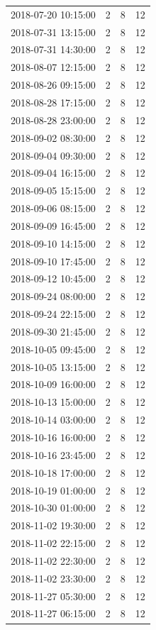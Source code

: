 \begin{tabular}{lrrr}
2018-07-20 10:15:00 & 2 & 8 & 12 \\
2018-07-31 13:15:00 & 2 & 8 & 12 \\
2018-07-31 14:30:00 & 2 & 8 & 12 \\
2018-08-07 12:15:00 & 2 & 8 & 12 \\
2018-08-26 09:15:00 & 2 & 8 & 12 \\
2018-08-28 17:15:00 & 2 & 8 & 12 \\
2018-08-28 23:00:00 & 2 & 8 & 12 \\
2018-09-02 08:30:00 & 2 & 8 & 12 \\
2018-09-04 09:30:00 & 2 & 8 & 12 \\
2018-09-04 16:15:00 & 2 & 8 & 12 \\
2018-09-05 15:15:00 & 2 & 8 & 12 \\
2018-09-06 08:15:00 & 2 & 8 & 12 \\
2018-09-09 16:45:00 & 2 & 8 & 12 \\
2018-09-10 14:15:00 & 2 & 8 & 12 \\
2018-09-10 17:45:00 & 2 & 8 & 12 \\
2018-09-12 10:45:00 & 2 & 8 & 12 \\
2018-09-24 08:00:00 & 2 & 8 & 12 \\
2018-09-24 22:15:00 & 2 & 8 & 12 \\
2018-09-30 21:45:00 & 2 & 8 & 12 \\
2018-10-05 09:45:00 & 2 & 8 & 12 \\
2018-10-05 13:15:00 & 2 & 8 & 12 \\
2018-10-09 16:00:00 & 2 & 8 & 12 \\
2018-10-13 15:00:00 & 2 & 8 & 12 \\
2018-10-14 03:00:00 & 2 & 8 & 12 \\
2018-10-16 16:00:00 & 2 & 8 & 12 \\
2018-10-16 23:45:00 & 2 & 8 & 12 \\
2018-10-18 17:00:00 & 2 & 8 & 12 \\
2018-10-19 01:00:00 & 2 & 8 & 12 \\
2018-10-30 01:00:00 & 2 & 8 & 12 \\
2018-11-02 19:30:00 & 2 & 8 & 12 \\
2018-11-02 22:15:00 & 2 & 8 & 12 \\
2018-11-02 22:30:00 & 2 & 8 & 12 \\
2018-11-02 23:30:00 & 2 & 8 & 12 \\
2018-11-27 05:30:00 & 2 & 8 & 12 \\
2018-11-27 06:15:00 & 2 & 8 & 12 \\

\end{tabular}
